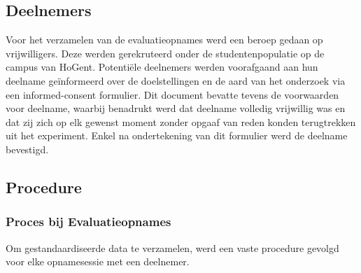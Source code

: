 \subsection{Deelnemers}

Voor het verzamelen van de evaluatieopnames werd een beroep gedaan op vrijwilligers. 
Deze werden gerekruteerd onder de studentenpopulatie op de campus van HoGent. 
Potentiële deelnemers werden voorafgaand aan hun deelname geïnformeerd over de doelstellingen en de aard van het onderzoek 
via een informed-consent formulier. Dit document bevatte tevens de voorwaarden voor deelname, 
waarbij benadrukt werd dat deelname volledig vrijwillig was en dat zij zich op elk gewenst moment zonder 
opgaaf van reden konden terugtrekken uit het experiment. 
Enkel na ondertekening van dit formulier werd de deelname bevestigd.

\subsection{Procedure}

\subsubsection{Proces bij Evaluatieopnames}

Om gestandaardiseerde data te verzamelen, werd een vaste procedure gevolgd voor elke opnamesessie met een deelnemer.


